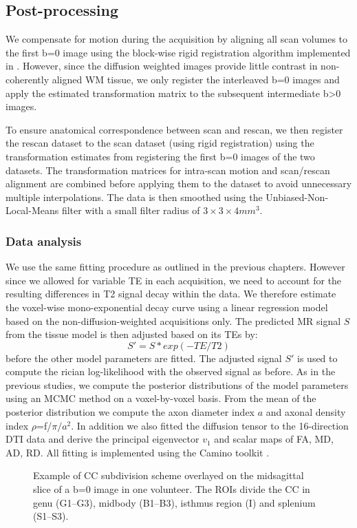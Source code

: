 \subsection{Post-processing}
We compensate for motion during the acquisition by aligning all scan volumes to the first b=0 image using the block-wise rigid registration algorithm \citep{Ourselin:2001} implemented in \citep{Modat:2010}. However, since the diffusion weighted images provide little contrast in non-coherently aligned WM tissue, we only register the interleaved b=0 images and apply the estimated transformation matrix to the subsequent intermediate b>0 images.   

To ensure anatomical correspondence between scan and rescan, we then register the rescan dataset to the scan dataset (using rigid registration) using the transformation estimates from registering  the first b=0 images of the two datasets. The transformation matrices for intra-scan motion and scan/rescan alignment are combined before applying them to the dataset to avoid unnecessary multiple interpolations. The data is then smoothed using the Unbiased-Non-Local-Means filter \citep{Tristan-Vega:2012} with a small filter radius of $3\times3\times4 mm^3$.

\subsubsection*{Data analysis}
We use the same fitting procedure as outlined in the previous chapters. However since we allowed for variable TE in each acquisition, we need to account for the resulting differences in T2 signal decay within the data. We therefore estimate the voxel-wise mono-exponential decay curve using a linear regression model based on the non-diffusion-weighted acquisitions only. The predicted MR signal $S$ from the tissue model is then adjusted based on its \glspl{TE} by:
\begin{equation}
	S' = S * exp(-TE/T2)
\end{equation}
before the other model parameters are fitted. The adjusted signal $S'$ is used to compute the rician log-likelihood with the observed signal as before. As in the previous studies, we compute the posterior distributions of the model parameters using an MCMC method on a voxel-by-voxel basis. From the mean of the posterior distribution we compute the axon diameter index $a$ and axonal density index $\rho$=f/$\pi/a^2$. In addition we also fitted the diffusion tensor to the 16-direction DTI data and derive the principal eigenvector $v_1$ and scalar maps of FA, MD, AD, RD. All fitting is implemented using the Camino toolkit \citep{Cook:2006}.
\begin{figure}[ht]
	\centering
	\caption{Example of CC subdivision scheme overlayed on the midsagittal slice of a b=0 image in one volunteer. The ROIs divide the CC in genu (G1--G3), midbody (B1--B3), isthmus region (I) and splenium (S1--S3).}
	\label{fig:chap9 CC ROIs}
\end{figure}
